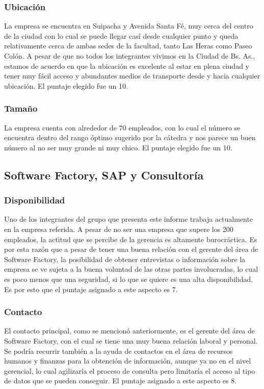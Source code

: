 \documentclass[12pt,a4paper,spanish]{article}
\begin{document}
\subsubsection{Ubicaci\'{o}n}
La empresa se encuentra en Suipacha y Avenida Santa F\'{e}, muy cerca del centro de la ciudad con lo cual se puede llegar cas\'{i} desde cualquier punto y queda relativamente cerca de ambas sedes de la facultad, tanto Las Heras como Paseo Col\'{o}n. A pesar de que no todos los integrantes vivimos en la Ciudad de Bs. As., estamos de acuerdo en que la ubicaci\'{o}n es excelente al estar en plena ciudad y tener muy f\'{a}cil acceso y abundantes medios de transporte desde y hacia cualquier ubicaci\'on. El puntaje elegido fue un 10.

\subsubsection{Tama\~{n}o}
La empresa cuenta con alrededor de 70 empleados, con lo cual el n\'umero se encuentra dentro del rango \'optimo sugerido por la c\'atedra y nos parece un buen n\'{u}mero al no ser muy grande ni muy chico. El puntaje elegido fue un 10.

\subsection{Software Factory, SAP y Consultor\'{i}a}
\subsubsection{Disponibilidad}

Uno de los integrantes del grupo que presenta este informe trabaja actualmente en la empresa referida. A pesar de no ser una empresa que supere los 200 empleados, la actitud que se percibe de la gerencia es altamente burocr\'{a}ctica. Es por esta raz\'{o}n que a pesar de tener una buena relaci\'{o}n con el gerente del \'{a}rea de Software Factory, la posibilidad de obtener entrevistas o informaci\'{o}n sobre la empresa se ve sujeta a la buena voluntad de las otras partes involucradas, lo cual es poco menos que una seguridad, si lo que se quiere es una alta disponibilidad. Es por esto que el puntaje asignado a este aspecto es 7.

\subsubsection{Contacto}

El contacto principal, como se mencion\'{o} anteriormente, es el gerente del \'{a}rea de Software Factory, con el cual se tiene una muy buena relaci\'{o}n laboral y personal. Se podr\'{i}a recurrir tambi\'{e}n a la ayuda de contactos en el \'{a}rea de recursos humanos y finanzas para la obtenci\'{o}n de informaci\'{o}n, aunque ya no en el nivel gerencial, lo cual agilizar\'{i}a el proceso de consulta pero limitar\'{i}a el acceso al tipo de datos que se pueden conseguir. El puntaje asignado a este aspecto es 8.
\end{document}
